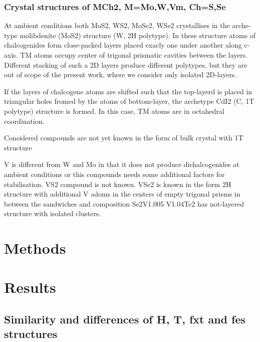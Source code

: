 \documentclass[a4paperm]{article}
\begin{document}
\subsubsection{Crystal structures of MCh2, M=Mo,W,Vm, Ch=S,Se}
At ambient conditions both MoS2, WS2, MoSe2, WSe2 crystallises in the arche-type molibdenite (MoS2) structure (W, 2H polytype).
In these structure atoms of chalcogenides form close-packed layers placed exacly one under another along c-axis.
TM atoms occupy center of trigonal prismatic cavities between the layers.
Different stacking of such a 2D layers produce different polytypes, but they are out of scope of the present work, where we consider only isolated 2D-layers.

If the layers of chalcogene atoms are shifted such that the top-layerd is placed in triangular holes fromed by the atoms of bottom-layer, the archetype CdI2 (C, 1T polytype) structure is formed. 
In this case, TM atoms are in octahedral coordination.

Considered compounds are not yet known in the form of bulk crystal with 1T structure 

V is different from W and Mo in that it does not produce dichalcogenides at ambient conditions or this compounds needs some additional factors for stabilisation.
VS2 compound is not known.
VSe2 is known in the form 2H structure with additional V adoms in the centers of empty trigonal prisms in between the sandwiches and composition Se2V1.005
V1.04Te2 has not-layered structure with isolated clusters.



		\section{Methods}



			\section{Results}

\subsection{Similarity and differences of H, T, fxt and fes structures}
\end{document}
